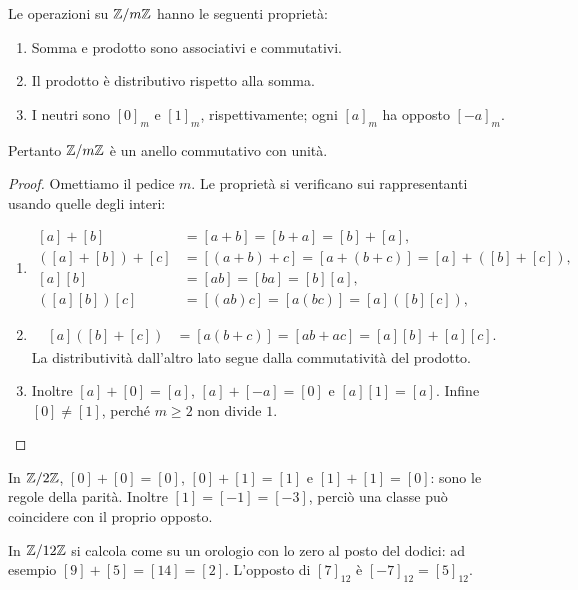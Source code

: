 \begin{proposizione}
Le operazioni su $\mathbb{Z}/m\mathbb{Z}$ hanno le seguenti proprietà:
\begin{enumerate}[label=\arabic*.]
\item Somma e prodotto sono associativi e commutativi.
\item Il prodotto è distributivo rispetto alla somma.
\item I neutri sono $[0]_m$ e $[1]_m$, rispettivamente; ogni $[a]_m$ ha opposto $[-a]_m$.
\end{enumerate}
Pertanto $\mathbb{Z}/m\mathbb{Z}$ è un anello commutativo con unità.
\end{proposizione}
\begin{proof}
Omettiamo il pedice $m$. Le proprietà si verificano sui rappresentanti usando quelle degli interi:
\begin{enumerate}[label=\arabic*.]
\item
\[
\begin{aligned}
[a]+[b]&=[a+b]=[b+a]=[b]+[a],\\
([a]+[b])+[c]&=[(a+b)+c]=[a+(b+c)]=[a]+([b]+[c]),\\
[a][b]&=[ab]=[ba]=[b][a],\\
([a][b])[c]&=[(ab)c]=[a(bc)]=[a]([b][c]),
\end{aligned}
\]
\item
\[
\begin{aligned}
[a]([b]+[c])&=[a(b+c)]=[ab+ac]=[a][b]+[a][c].
\end{aligned}
\]
La distributività dall'altro lato segue dalla commutatività del prodotto.
\item Inoltre $[a]+[0]=[a]$, $[a]+[-a]=[0]$ e $[a][1]=[a]$. Infine $[0]\ne[1]$, perché $m\ge2$ non divide $1$.
\end{enumerate}
\end{proof}

\begin{esempio}
In $\mathbb{Z}/2\mathbb{Z}$, $[0]+[0]=[0]$, $[0]+[1]=[1]$ e $[1]+[1]=[0]$: sono le regole della parità. Inoltre $[1]=[-1]=[-3]$, perciò una classe può coincidere con il proprio opposto.

In $\mathbb{Z}/12\mathbb{Z}$ si calcola come su un orologio con lo zero al posto del dodici: ad esempio $[9]+[5]=[14]=[2]$. L'opposto di $[7]_{12}$ è $[-7]_{12}=[5]_{12}$.
\end{esempio}

\begin{schema}
\end{schema}

